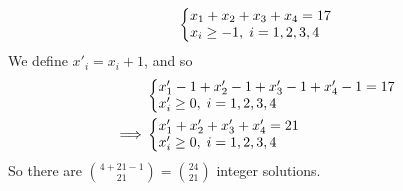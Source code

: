 \documentclass{article}
\begin{document}
\section{} %
\subsection{} %
\begin{equation*}
	\left\{
	\begin{array}{@{}ll@{}}
		x_1+x_2+x_3+x_4=17\\
		x_i\ge-1,\;i=1,2,3,4
	\end{array}\right.
\end{equation*}
We define $x'_i=x_i+1$, and so
\begin{align*}
	&\left\{
		\begin{array}{@{}ll@{}}
		x'_1-1+x'_2-1+x'_3-1+x'_4-1=17\\
		x'_i\ge0,\;i=1,2,3,4
	\end{array}\right.\\
	\implies&\left\{
	\begin{array}{@{}ll@{}}
		x'_1+x'_2+x'_3+x'_4=21\\
		x'_i\ge0,\;i=1,2,3,4
	\end{array}\right.
\end{align*}
So there are $\binom{4+21-1}{21}=\binom{24}{21}$ integer solutions.
\end{document}
